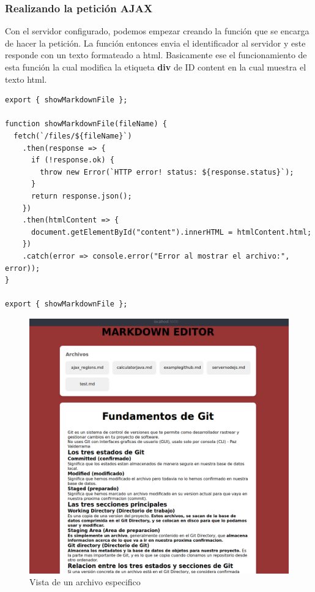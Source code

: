 \subsubsection{Realizando la petición AJAX}
Con el servidor configurado, podemos empezar creando la función que se encarga de hacer la petición. La función entonces envia el identificador al servidor y este responde con un texto formateado a html. Basicamente ese el funcionamiento de esta función la cual modifica la etiqueta \textbf{div} de ID content en la cual muestra el texto html.

\begin{verbatim}
export { showMarkdownFile };

function showMarkdownFile(fileName) {
  fetch(`/files/${fileName}`)
    .then(response => {
      if (!response.ok) {
        throw new Error(`HTTP error! status: ${response.status}`);
      }
      return response.json();
    })
    .then(htmlContent => {
      document.getElementById("content").innerHTML = htmlContent.html;
    })
    .catch(error => console.error("Error al mostrar el archivo:", error));
}
  
export { showMarkdownFile };
\end{verbatim}

\begin{figure}[H]
  \centering
  \includegraphics[width=1.0\textwidth]{img/show_markdown.png}
  \caption{Vista de un archivo especifico}
\end{figure}

